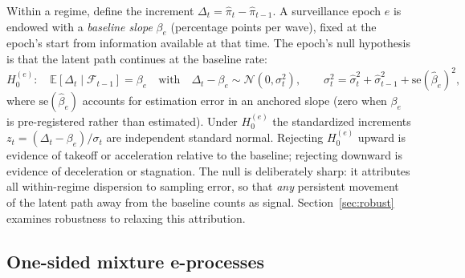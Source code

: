 \documentclass[review,authoryear,12pt]{elsarticle}
\newcommand{\E}{\mathbb{E}}
\begin{document}
Within a regime, define the increment $\Delta_t = \hat{\pi}_t - \hat{\pi}_{t-1}$. A surveillance epoch $e$ is endowed with a \emph{baseline slope} $\beta_e$ (percentage points per wave), fixed at the epoch's start from information available at that time. The epoch's null hypothesis is that the latent path continues at the baseline rate:
\begin{equation}
H_0^{(e)}:\quad \E[\Delta_t \mid \mathcal{F}_{t-1}] = \beta_e
\quad\text{with}\quad
\Delta_t - \beta_e \sim \mathcal{N}(0, \sigma_t^2),
\qquad
\sigma_t^2 = \hat{\sigma}_t^2 + \hat{\sigma}_{t-1}^2 + \mathrm{se}(\hat{\beta}_e)^2,
\label{eq:null}
\end{equation}
where $\mathrm{se}(\hat{\beta}_e)$ accounts for estimation error in an anchored slope (zero when $\beta_e$ is pre-registered rather than estimated). Under $H_0^{(e)}$ the standardized increments $z_t = (\Delta_t - \beta_e)/\sigma_t$ are independent standard normal. Rejecting $H_0^{(e)}$ upward is evidence of takeoff or acceleration relative to the baseline; rejecting downward is evidence of deceleration or stagnation. The null is deliberately sharp: it attributes all within-regime dispersion to sampling error, so that \emph{any} persistent movement of the latent path away from the baseline counts as signal. Section~\ref{sec:robust} examines robustness to relaxing this attribution.

\subsection{One-sided mixture e-processes}
\label{sec:eprocess}
\end{document}
